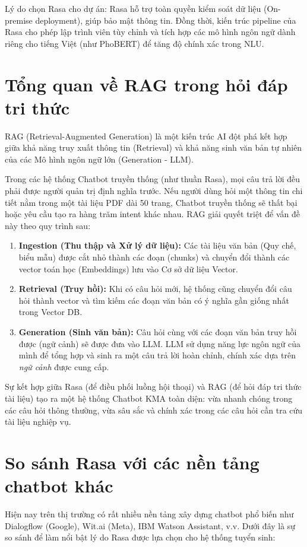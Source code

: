 Lý do chọn Rasa cho dự án: Rasa hỗ trợ toàn quyền kiểm soát dữ liệu (On-premise deployment), giúp bảo mật thông tin. Đồng thời, kiến trúc pipeline của Rasa cho phép lập trình viên tùy chỉnh và tích hợp các mô hình ngôn ngữ dành riêng cho tiếng Việt (như PhoBERT) để tăng độ chính xác trong NLU.

\section{Tổng quan về RAG trong hỏi đáp tri thức}
RAG (Retrieval-Augmented Generation) là một kiến trúc AI đột phá kết hợp giữa khả năng truy xuất thông tin (Retrieval) và khả năng sinh văn bản tự nhiên của các Mô hình ngôn ngữ lớn (Generation - LLM). 

Trong các hệ thống Chatbot truyền thống (như thuần Rasa), mọi câu trả lời đều phải được người quản trị định nghĩa trước. Nếu người dùng hỏi một thông tin chi tiết nằm trong một tài liệu PDF dài 50 trang, Chatbot truyền thống sẽ thất bại hoặc yêu cầu tạo ra hàng trăm intent khác nhau. RAG giải quyết triệt để vấn đề này theo quy trình sau:
\begin{enumerate}
    \item \textbf{Ingestion (Thu thập và Xử lý dữ liệu):} Các tài liệu văn bản (Quy chế, biểu mẫu) được cắt nhỏ thành các đoạn (chunks) và chuyển đổi thành các vector toán học (Embeddings) lưu vào Cơ sở dữ liệu Vector.
    \item \textbf{Retrieval (Truy hồi):} Khi có câu hỏi mới, hệ thống cũng chuyển đổi câu hỏi thành vector và tìm kiếm các đoạn văn bản có ý nghĩa gần giống nhất trong Vector DB.
    \item \textbf{Generation (Sinh văn bản):} Câu hỏi cùng với các đoạn văn bản truy hồi được (ngữ cảnh) sẽ được đưa vào LLM. LLM sử dụng năng lực ngôn ngữ của mình để tổng hợp và sinh ra một câu trả lời hoàn chỉnh, chính xác dựa trên \textit{ngữ cảnh} được cung cấp.
\end{enumerate}

Sự kết hợp giữa Rasa (để điều phối luồng hội thoại) và RAG (để hỏi đáp tri thức tài liệu) tạo ra một hệ thống Chatbot KMA toàn diện: vừa nhanh chóng trong các câu hỏi thông thường, vừa sâu sắc và chính xác trong các câu hỏi cần tra cứu tài liệu nghiệp vụ.

\section{So sánh Rasa với các nền tảng chatbot khác}
Hiện nay trên thị trường có rất nhiều nền tảng xây dựng chatbot phổ biến như Dialogflow (Google), Wit.ai (Meta), IBM Watson Assistant, v.v. Dưới đây là sự so sánh để làm nổi bật lý do Rasa được lựa chọn cho hệ thống tuyển sinh:


